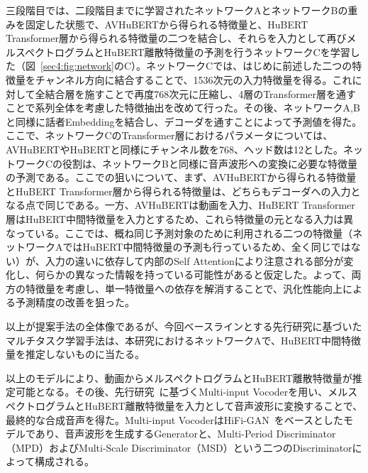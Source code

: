 \documentclass[12pt]{jarticle}
\numberwithin{equation}{section}    %
\numberwithin{figure}{section}      %
\numberwithin{table}{section}      %
\begin{document}
三段階目では、二段階目までに学習されたネットワークAとネットワークBの重みを固定した状態で、AVHuBERTから得られる特徴量と、HuBERT Transformer層から得られる特徴量の二つを結合し、それらを入力として再びメルスペクトログラムとHuBERT離散特徴量の予測を行うネットワークCを学習した（図~\ref{sec4:fig:network}のC）。ネットワークCでは、はじめに前述した二つの特徴量をチャンネル方向に結合することで、1536次元の入力特徴量を得る。これに対して全結合層を施すことで再度768次元に圧縮し、4層のTransformer層を通すことで系列全体を考慮した特徴抽出を改めて行った。その後、ネットワークA,Bと同様に話者Embeddingを結合し、デコーダを通すことによって予測値を得た。ここで、ネットワークCのTransformer層におけるパラメータについては、AVHuBERTやHuBERTと同様にチャンネル数を768、ヘッド数は12とした。ネットワークCの役割は、ネットワークBと同様に音声波形への変換に必要な特徴量の予測である。ここでの狙いについて、まず、AVHuBERTから得られる特徴量とHuBERT Transformer層から得られる特徴量は、どちらもデコーダへの入力となる点で同じである。一方、AVHuBERTは動画を入力、HuBERT Transformer層はHuBERT中間特徴量を入力とするため、これら特徴量の元となる入力は異なっている。ここでは、概ね同じ予測対象のために利用される二つの特徴量（ネットワークAではHuBERT中間特徴量の予測も行っているため、全く同じではない）が、入力の違いに依存して内部のSelf Attentionにより注意される部分が変化し、何らかの異なった情報を持っている可能性があると仮定した。よって、両方の特徴量を考慮し、単一特徴量への依存を解消することで、汎化性能向上による予測精度の改善を狙った。

以上が提案手法の全体像であるが、今回ベースラインとする先行研究\cite{choi2023intelligible}に基づいたマルチタスク学習手法は、本研究におけるネットワークAで、HuBERT中間特徴量を推定しないものに当たる。

以上のモデルにより、動画からメルスペクトログラムとHuBERT離散特徴量が推定可能となる。その後、先行研究~\cite{choi2023intelligible}に基づくMulti-input Vocoderを用い、メルスペクトログラムとHuBERT離散特徴量を入力として音声波形に変換することで、最終的な合成音声を得た。Multi-input VocoderはHiFi-GAN~\cite{kong2020hifi}をベースとしたモデルであり、音声波形を生成するGeneratorと、Multi-Period Discriminator（MPD）およびMulti-Scale Discriminator（MSD）という二つのDiscriminatorによって構成される。
\end{document}
